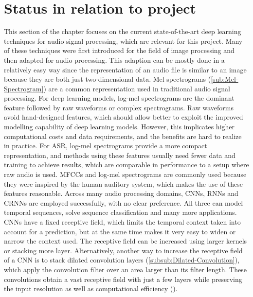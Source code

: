 \section{Status in relation to project}
\label{sec:Status-Relation-Project}
This section of the chapter focuses on the current state-of-the-art deep learning techniques for audio signal processing, which are relevant for this project. Many of these techniques were first introduced for the field of image processing and then adapted for audio processing. This adaption can be mostly done in a relatively easy way since the representation of an audio file is similar to an image because they are both just two-dimensional data.
\newline
\newline
Mel spectrograms (\ref{sub:Mel-Spectrogram}) are a common representation used in traditional audio signal processing. For deep learning models, log-mel spectrograms are the dominant feature followed by raw waveforms or complex spectrograms. Raw waveforms avoid hand-designed features, which should allow better to exploit the improved modelling capability of deep learning models. However, this implicates higher computational costs and data requirements, and the benefits are hard to realize in practice. For \gls{ASR}, log-mel spectrograms provide a more compact representation, and methods using these features usually need fewer data and training to achieve results, which are comparable in performance to a setup where raw audio is used. \glspl{MFCC} and log-mel spectrograms are commonly used because they were inspired by the human auditory system, which makes the use of these features reasonable.
\newline
\newline
Across many audio processing domains, \glspl{CNN}, \glspl{RNN} and \glspl{CRNN} are employed successfully, with no clear preference. All three can model temporal sequences, solve sequence classification and many more applications. \glspl{CNN} have a fixed receptive field, which limits the temporal context taken into account for a prediction, but at the same time makes it very easy to widen or narrow the context used. The receptive field can be increased using larger kernels or stacking more layer. Alternatively, another way to increase the receptive field of a \gls{CNN} is to stack dilated convolution layers (\ref{subsub:Dilated-Convolution}), which apply the convolution filter over an area larger than its filter length. These convolutions obtain a vast receptive field with just a few layers while preserving the input resolution as well as computational efficiency (\cite{franceschi_unsupervised_2020}).
